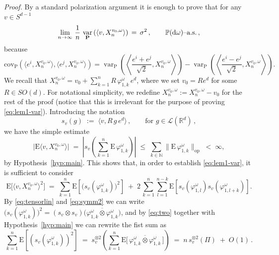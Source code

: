 \documentclass[a4paper,reqno,11pt]{amsart}
\numberwithin{equation}{section}
\newcommand{\bbP}{{\ensuremath{\mathbb P}} }
\newcommand{\cL}{{\ensuremath{\mathcal L}} }
\newcommand{\gp}{\varphi}
\newcommand{\go}{\omega}
\newcommand{\dd}{\text{\rm d}}             %
\newcommand{\R}{\mathbb{R}}
\newcommand{\N}{\mathbb{N}}
\DeclareMathOperator{\var}{var}
\def\bP{\ensuremath{\bs{\mathrm{P}}}}
\def\bE{\ensuremath{\bs{\mathrm{E}}}}
\def\bs{\boldsymbol}
\renewcommand{\phi}{\varphi}
\begin{document}
\noindent
{\it Proof.}
By a standard polarization argument it is enough to prove that
for any $v  \in S^{d-1}$
\begin{equation}
\label{eq:lem1-var}
\lim_{n \to \infty} \, \frac 1n \,
\var_{\bP} \left(
\langle v, X_n^{v_0, \go}\rangle
\right)
\, =\, \sigma^2 \,, \qquad \text{$\bbP(\dd \go)$--a.s.}\,,
\end{equation}
because
\begin{equation}
\mathrm{cov}_{\bP} \left(
\langle e^i, X_n^{v_0, \go}\rangle,
\langle e^j, X_n^{v_0, \go}\rangle
\right) = \var_{\bP} \left(\left\langle \frac{e^i+ e^j}{\sqrt{2}}, X_n^{v_0, \go}\right\rangle \right) - \var_{\bP} \left(\left\langle  \frac{e^i- e^j}{\sqrt{2}}, X_n^{v_0, \go}\right\rangle \right).
\end{equation}
We recall that $X_n^{v_0, \go} = v_0 + \sum_{k=1}^n R \, \phi^\go_{1,k} \, e^d$,
where we set $v_0 = R e^d$ for some $R \in SO(d)$. For notational simplicity, we
redefine $X_n^{v_0, \go} := X_n^{v_0, \go} - v_0$ for the rest of the proof
(notice that this is irrelevant for the purpose of proving \eqref{eq:lem1-var}).
Introducing the notation
\begin{equation} \label{eq:def_sv}
	s_v(g) \;:=\; \langle v, R \, g \, e^d \rangle \,, \qquad \text{for } g \in \cL(\R^d)\,,
\end{equation}
we have the simple estimate
\begin{equation}
\label{eq:fctrlm}
\big\vert \bE \langle v,X_n^{v_0, \go}\rangle \big\vert
\; = \; \left \vert  s_v \left(\sum_{k=1}^n  \bE \, \phi_{1,k}^\go \right) \right\vert
\; \le \; \sum_{k \in \N} \big\| \bE \, \phi_{1,k}^\go \big\|_{\text{op}}
\; < \; \infty ,
\end{equation}
by Hypothesis~\ref{hyp:main}. This
shows that, in order to establish \eqref{eq:lem1-var}, it is sufficient to consider
\begin{equation}
\label{eq:diagnondiag}
\bE\big[ \langle v,X_n^{v_0, \go}\rangle ^2\big] \; =\;
\sum_{k=1}^n \bE \left[ \big (s_{v} ( \gp_{1,k}^\go )\big)^2
\right] \;+\; 2 \, \sum_{k=1}^n
\sum_{l=1}^{n-k} \bE \left[
s_{v} \left( \gp_{1,l}^\go \right)
s_{v} \left( \gp_{1,l+k}^\go \right)
\right].
\end{equation}
By \eqref{eq:tensorlin} and \eqref{eq:symm2} we can write $(s_{v} ( \gp_{1,k}^\go )\big)^2
= (s_v \otimes s_v)\big( \overline{\gp_{1,k}^\go \otimes \gp_{1,k}^\go} \big)$,
and by \eqref{eq:two} together with Hypothesis~\ref{hyp:main}
we can rewrite the fist sum as
\begin{equation}
	\sum_{k=1}^n \bE \left[ \left (s_{v} \left( \gp_{1,k}^\go \right)\right)^2 \right]
	\;=\; s_v^{\otimes 2}\left(\sum_{k=1}^n  \bE \big[\,
	\overline{\gp_{1,k}^\go \otimes  \gp_{1,k}^\go}\, \big] \right) \;=\;
	n\, s_v^{\otimes 2}(\Pi)  \;+\; O(1) \,.
\end{equation}
\end{document}
